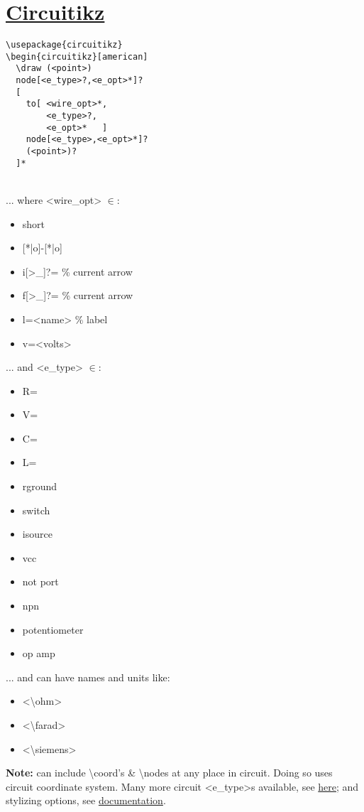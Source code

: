 \section{\href{http://mirrors.ctan.org/graphics/pgf/contrib/circuitikz/doc/circuitikzmanual.pdf}{Circuitikz}}

\begin{minipage}{6.5cm}
\begin{lstlisting}
\usepackage{circuitikz}
\begin{circuitikz}[american]
  \draw (<point>) 
  node[<e_type>?,<e_opt>*]?
  [
    to[ <wire_opt>*,
        <e_type>?,
        <e_opt>*   ] 
    node[<e_type>,<e_opt>*]? 
    (<point>)?     
  ]*
\end{lstlisting}
\end{minipage} \\
... where <wire\_opt> $\in$: 
\begin{itemize}
    \item short
    \item {[*|o]}-[*|o]
    \item i[>\_]?= \% current arrow
    \item f[>\_]?= \% current arrow
    \item l=<name> \% label
    \item v=<volts>
\end{itemize}
... and <e\_type> $\in$: 
\begin{multicols}{2}
\begin{itemize}
    \item R=
    \item V=
    \item C=
    \item L=
    \item rground
    \item switch
    \item isource
    \item vcc
    \item not port
    \item npn
    \item potentiometer
    \item op amp
\end{itemize}
\end{multicols}
... and can have names and units like:
\begin{itemize}
    \item <\textbackslash ohm>
    \item <\textbackslash farad>
    \item <\textbackslash siemens>
\end{itemize}
\textbf{Note:} can include \textbackslash coord's \& \textbackslash nodes at any place in circuit.  Doing so uses circuit coordinate system.  Many more circuit <e\_type>s available, see \href{https://www.overleaf.com/learn/latex/CircuiTikz_package}{here}; and stylizing options, see \href{http://mirrors.ctan.org/graphics/pgf/contrib/circuitikz/doc/circuitikzmanual.pdf}{documentation}.

\ \\